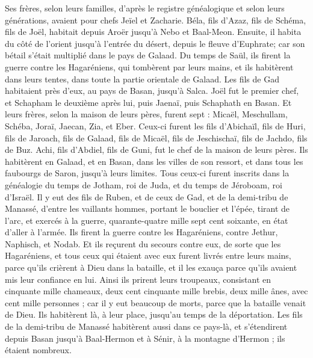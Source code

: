 \begin{multicols}{2}
Ses frères, selon leurs familles, d'après le registre généalogique et selon leurs générations, avaient pour chefs Jeïel et Zacharie.
Béla, fils d'Azaz, fils de Schéma, fils de Joël, habitait depuis Aroër jusqu'à Nebo et Baal-Meon.
Ensuite, il habita du côté de l'orient jusqu'à l'entrée du désert, depuis le fleuve d'Euphrate; car son bétail s'était multiplié dans le pays de Galaad.
Du temps de Saül, ils firent la guerre contre les Hagaréniens, qui tombèrent par leurs mains, et ils habitèrent dans leurs tentes, dans toute la partie orientale de Galaad.
Les fils de Gad habitaient près d'eux, au pays de Basan, jusqu'à Salca.
Joël fut le premier chef, et Schapham le deuxième après lui, puis Jaenaï, puis Schaphath en Basan.
Et leurs frères, selon la maison de leurs pères, furent sept : Micaël, Meschullam, Schéba, Joraï, Jaecan, Zia, et Eber.
Ceux-ci furent les fils d'Abichaïl, fils de Huri, fils de Jaroach, fils de Galaad, fils de Micaël, fils de Jeschischaï, fils de Jachdo, fils de Buz.
Achi, fils d'Abdiel, fils de Guni, fut le chef de la maison de leurs pères.
Ils habitèrent en Galaad, et en Basan, dans les villes de son ressort, et dans tous les faubourgs de Saron, jusqu'à leurs limites.
Tous ceux-ci furent inscrits dans la généalogie du temps de Jotham, roi de Juda, et du temps de Jéroboam, roi d'Israël.
Il y eut des fils de Ruben, et de ceux de Gad, et de la demi-tribu de Manassé, d'entre les vaillants hommes, portant le bouclier et l'épée, tirant de l'arc, et exercés à la guerre, quarante-quatre mille sept cent soixante, en état d'aller à l'armée.
Ils firent la guerre contre les Hagaréniens, contre Jethur, Naphisch, et Nodab.
Et ils reçurent du secours contre eux, de sorte que les Hagaréniens, et tous ceux qui étaient avec eux furent livrés entre leurs mains, parce qu'ils crièrent à Dieu dans la bataille, et il les exauça parce qu'ils avaient mis leur confiance en lui.
Ainsi ils prirent leurs troupeaux, consistant en cinquante mille chameaux, deux cent cinquante mille brebis, deux mille ânes, avec cent mille personnes ;
car il y eut beaucoup de morts, parce que la bataille venait de Dieu. Ils habitèrent là, à leur place, jusqu'au temps de la déportation.
Les fils de la demi-tribu de Manassé habitèrent aussi dans ce pays-là, et s'étendirent depuis Basan jusqu'à Baal-Hermon et à Sénir, à la montagne d'Hermon ; ils étaient nombreux.

\end{multicols}
